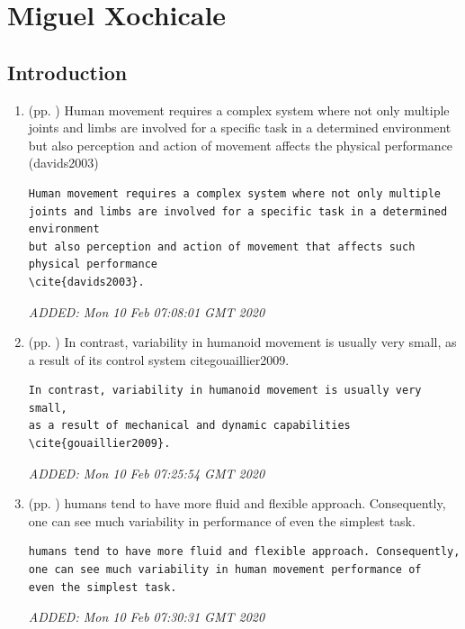 \documentclass[10pt]{article}
\begin{document}
\section{Miguel Xochicale}
\subsection{Introduction}
\begin{enumerate}

\item  (pp. ) 
	Human movement requires a complex system where not only multiple
joints and limbs are involved for a specific task in a determined environment
but also perception and action of movement affects the physical performance (davids2003)




	\begin{verbatim}
Human movement requires a complex system where not only multiple
joints and limbs are involved for a specific task in a determined environment
but also perception and action of movement that affects such 
physical performance 
\cite{davids2003}. 

	\end{verbatim}
	\textit{
	ADDED: Mon 10 Feb 07:08:01 GMT 2020
	}
	\\


\item  (pp. ) 
In contrast, variability in humanoid movement is usually very small,
as a result of its control system cite{gouaillier2009}. 

 
	\begin{verbatim}
In contrast, variability in humanoid movement is usually very small,
as a result of mechanical and dynamic capabilities \cite{gouaillier2009}. 
\end{verbatim}
	\textit{
	ADDED: Mon 10 Feb 07:25:54 GMT 2020
	}
	\\


\item  (pp. ) 
humans tend to have more fluid and flexible approach. Consequently, 
one can see much variability in performance of 
even the simplest task.


\begin{verbatim}
humans tend to have more fluid and flexible approach. Consequently, 
one can see much variability in human movement performance of 
even the simplest task.
\end{verbatim}
	\textit{
	ADDED: Mon 10 Feb 07:30:31 GMT 2020
	}
	\\



\end{enumerate}
\end{document}
